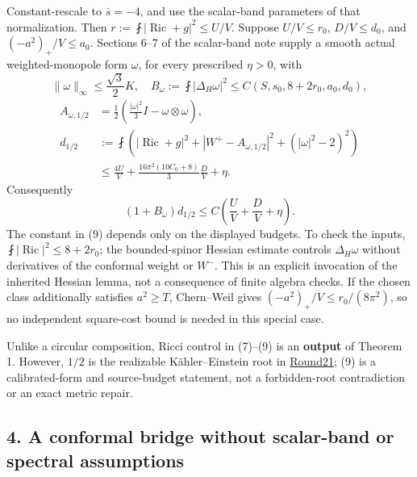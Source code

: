 \documentclass[
  11pt,
]{article}
\begin{document}
Constant-rescale to \(\bar s=-4\), and use the scalar-band parameters of
that normalization. Then \(r:=\fint|\operatorname{Ric}+g|^2\le U/V\).
Suppose \(U/V\le r_0\), \(D/V\le d_0\), and \((-a^2)_+/V\le a_0\).
Sections 6--7 of the scalar-band note supply a smooth actual
weighted-monopole form \(\omega\), for every prescribed \(\eta>0\), with
\[
 \|\omega\|_\infty\le\frac{\sqrt3}{2}K,\quad
 B_\omega:=\fint|\Delta_H\omega|^2
       \le C(S,s_0,8+2r_0,a_0,d_0),
 \tag{7}
\] \[
\begin{aligned}
 A_{\omega,1/2}&=\frac12\left(\frac{|\omega|^2}{3}I-\omega\otimes\omega\right),\\
 d_{1/2}&:=\fint\left(|\operatorname{Ric}+g|^2
       +|W^+-A_{\omega,1/2}|^2+(|\omega|^2-2)^2\right)\\
 &\le\frac{4U}{V}+\frac{16\pi^2(10C_0+8)}3\frac D V+\eta.
\end{aligned}
\tag{8}
\] Consequently \[
 (1+B_\omega)d_{1/2}\le C\left(\frac U V+\frac D V+\eta\right).
 \tag{9}
\] The constant in (9) depends only on the displayed budgets. To check
the inputs, \(\fint|\operatorname{Ric}|^2\le8+2r_0\); the bounded-spinor
Hessian estimate controls \(\Delta_H\omega\) without derivatives of the
conformal weight or \(W^-\). This is an explicit invocation of the
inherited Hessian lemma, not a consequence of finite algebra checks. If
the chosen class additionally satisfies \(a^2\ge T\), Chern--Weil gives
\((-a^2)_+/V\le r_0/(8\pi^2)\), so no independent square-cost bound is
needed in this special case.

Unlike a circular composition, Ricci control in (7)--(9) is an
\textbf{output} of Theorem 1. However, \(1/2\) is the realizable
Kähler--Einstein root in \href{round21_analytic.md}{Round21}; (9) is a
calibrated-form and source-budget statement, not a forbidden-root
contradiction or an exact metric repair.

\hypertarget{a-conformal-bridge-without-scalar-band-or-spectral-assumptions}{%
\subsection{4. A conformal bridge without scalar-band or spectral
assumptions}\label{a-conformal-bridge-without-scalar-band-or-spectral-assumptions}}
\end{document}
